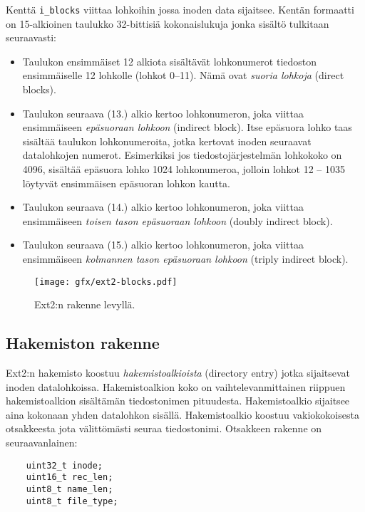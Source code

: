 Kenttä \texttt{i\_blocks} viittaa lohkoihin jossa inoden data sijaitsee.
Kentän formaatti on 15-alkioinen taulukko 32-bittisiä kokonaislukuja jonka sisältö tulkitaan seuraavasti:
\begin{itemize}
    \item Taulukon ensimmäiset 12 alkiota sisältävät lohkonumerot tiedoston ensimmäiselle 12 lohkolle (lohkot 0--11).
          Nämä ovat \emph{suoria lohkoja} (direct blocks).
    \item Taulukon seuraava (13.) alkio kertoo lohkonumeron, joka viittaa ensimmäiseen \emph{epäsuoraan lohkoon} (indirect block).
          Itse epäsuora lohko taas sisältää taulukon lohkonumeroita, jotka kertovat inoden seuraavat datalohkojen numerot.
          Esimerkiksi jos tiedostojärjestelmän lohkokoko on 4096, sisältää epäsuora lohko 1024 lohkonumeroa,
          jolloin lohkot 12 -- 1035 löytyvät ensimmäisen epäsuoran lohkon kautta.
    \item Taulukon seuraava (14.) alkio kertoo lohkonumeron, joka viittaa ensimmäiseen \emph{toisen tason epäsuoraan lohkoon} (doubly indirect block).

    \item Taulukon seuraava (15.) alkio kertoo lohkonumeron, joka viittaa ensimmäiseen \emph{kolmannen tason epäsuoraan lohkoon} (triply indirect block).
\end{itemize}

\begin{figure}
    \label{ext2_inode_format}
    \texttt{[image: gfx/ext2-blocks.pdf]}
    \caption{Ext2:n rakenne levyllä.}
\end{figure}

\subsection{Hakemiston rakenne}
Ext2:n hakemisto koostuu \emph{hakemistoalkioista} (directory entry) jotka sijaitsevat inoden datalohkoissa.
Hakemistoalkion koko on vaihtelevanmittainen riippuen hakemistoalkion sisältämän tiedostonimen pituudesta.
Hakemistoalkio sijaitsee aina kokonaan yhden datalohkon sisällä.
Hakemistoalkio koostuu vakiokokoisesta otsakkeesta jota välittömästi seuraa tiedostonimi.
Otsakkeen rakenne on seuraavanlainen:

\begin{verbatim}
	uint32_t inode;
	uint16_t rec_len;
	uint8_t name_len;
	uint8_t file_type;
\end{verbatim}

